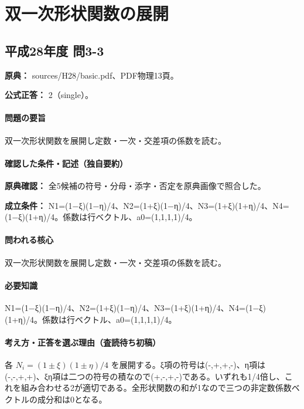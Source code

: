 \section{双一次形状関数の展開}

\subsection{平成28年度 問3-3}
\label{q:h28-reg-basic-3-3}

\noindent\textbf{原典：} sources/H28/basic.pdf、PDF物理13頁。

\textbf{公式正答：} 2（single）。

\paragraph{問題の要旨} 双一次形状関数を展開し定数・一次・交差項の係数を読む。

\paragraph{確認した条件・記述（独自要約）}\mbox{}\par

\noindent\textbf{原典確認：} 全5候補の符号・分母・添字・否定を原典画像で照合した。\par

\noindent\textbf{成立条件：} N1=\allowbreak{}(1−ξ)(1−η)/4、N2=\allowbreak{}(1+ξ)(1−η)/4、N3=\allowbreak{}(1+ξ)(1+η)/4、N4=\allowbreak{}(1−ξ)(1+η)/4。係数は行ベクトル、a0=\allowbreak{}(1,1,1,1)/4。\par

\paragraph{問われる核心} 双一次形状関数を展開し定数・一次・交差項の係数を読む。

\paragraph{必要知識} N1=\allowbreak{}(1−ξ)(1−η)/4、N2=\allowbreak{}(1+ξ)(1−η)/4、N3=\allowbreak{}(1+ξ)(1+η)/4、N4=\allowbreak{}(1−ξ)(1+η)/4。係数は行ベクトル、a0=\allowbreak{}(1,1,1,1)/4。

\paragraph{考え方・正答を選ぶ理由（査読待ち初稿）} 各 \(N_i=(1\pm\xi)(1\pm\eta)/4\) を展開する。ξ項の符号は(-,+,+,-)、η項は(-,-,+,+)、ξη項は二つの符号の積なので(+,-,+,-)である。いずれも1/4倍し、これを組み合わせる2が適切である。全形状関数の和が1なので三つの非定数係数ベクトルの成分和は0となる。

